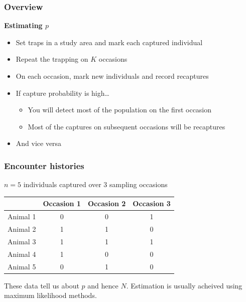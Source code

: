 \documentclass[color=usenames,dvipsnames]{beamer}\usepackage[]{graphicx}\usepackage[]{color}
\begin{document}
\begin{frame}
  \frametitle{Overview}
  \large
  {\bf Estimating $p$}
  \begin{itemize}[<+->]
    \item Set traps in a study area and mark each captured individual
    \item Repeat the trapping on $K$ occasions
    \item On each occasion, mark new individuals and record recaptures
    \item If capture probability is high\dots
    \begin{itemize}
      \large
      \item You will detect most of the population on the first
        occasion
      \item Most of the captures on subsequent occasions will be
        recaptures
    \end{itemize}
    \item And vice versa
  \end{itemize}
\end{frame}






\begin{frame}
  \frametitle{Encounter histories}
  {\centering \large $n=5$ individuals captured over 3 sampling occasions \par}
  \vspace{0.3cm}
  \begin{center}
    \small
    \begin{tabular}{lccc}
      \hline
      & Occasion 1 & Occasion 2 & Occasion 3 \\
      \hline
      Animal 1 & 0 & 0 & 1 \\
      Animal 2 & 1 & 1 & 0 \\
      Animal 3 & 1 & 1 & 1 \\
      Animal 4 & 1 & 0 & 0 \\
      Animal 5 & 0 & 1 & 0 \\
      \hline
    \end{tabular}
  \end{center}
  \pause
  \vfill
  \centering
  \large These data tell us about $p$ and hence $N$. Estimation is
  usually acheived using maximum likelihood methods.
\end{frame}
\end{document}
